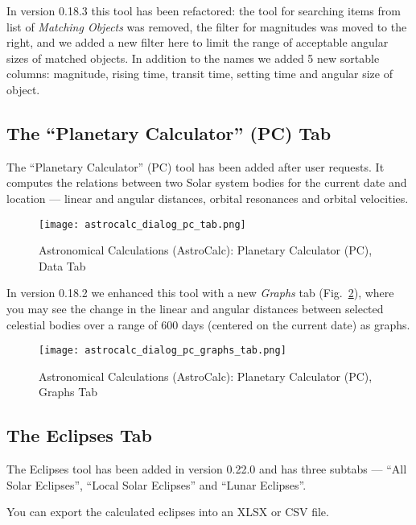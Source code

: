 In version 0.18.3  this tool has been refactored: the tool for searching items from list of \emph{Matching Objects} was removed,
the filter for magnitudes was moved to the right, and we added a new filter here to limit the range of acceptable angular sizes of matched objects.
In addition to the names we added 5 new sortable columns: magnitude, rising time, transit time, setting time and angular size of object.


\subsection{The ``Planetary Calculator'' (PC) Tab}
\label{sec:gui:AstroCalc:PC}

The ``Planetary Calculator'' (PC) tool has been added after user requests. 
It computes the relations between two Solar system bodies for the current date and location --- linear and angular distances, 
orbital resonances and orbital velocities.

\begin{figure}[tbp]
\centering\texttt{[image: astrocalc\_dialog\_pc\_tab.png]}
\caption{Astronomical Calculations (AstroCalc): Planetary Calculator (PC), Data Tab}
\label{fig:gui:AstroCalc:PC:Data}
\end{figure}

In version 0.18.2  we enhanced this tool with a
new \emph{Graphs} tab (Fig.~\ref{fig:gui:AstroCalc:PC:Graphs}), where
you may see the change in the linear and angular distances between
selected celestial bodies over a range of 600 days (centered on the
current date) as graphs.

\begin{figure}[tbp]
\centering\texttt{[image: astrocalc\_dialog\_pc\_graphs\_tab.png]}
\caption{Astronomical Calculations (AstroCalc): Planetary Calculator (PC), Graphs Tab}
\label{fig:gui:AstroCalc:PC:Graphs}
\end{figure}

\subsection{The Eclipses Tab}
\label{sec:gui:AstroCalc:Eclipses}

The Eclipses tool has been added in version 0.22.0 and has three subtabs --- ``All Solar Eclipses'', ``Local Solar Eclipses'' and ``Lunar Eclipses''. 

You can export the calculated eclipses into an XLSX or CSV file.

